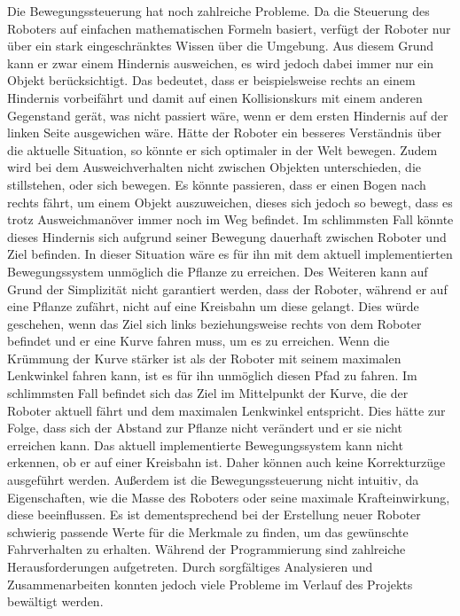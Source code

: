 Die Bewegungssteuerung hat noch zahlreiche Probleme. Da die Steuerung des Roboters auf einfachen mathematischen Formeln basiert, verfügt der Roboter nur über ein stark eingeschränktes Wissen über die Umgebung. Aus diesem Grund kann er zwar einem Hindernis ausweichen, es wird jedoch dabei immer nur ein Objekt berücksichtigt. Das bedeutet, dass er beispielsweise rechts an einem Hindernis vorbeifährt und damit auf einen Kollisionskurs mit einem anderen Gegenstand gerät, was nicht passiert wäre, wenn er dem ersten Hindernis auf der linken Seite ausgewichen wäre. Hätte der Roboter ein besseres Verständnis über die aktuelle Situation, so könnte er sich optimaler in der Welt bewegen. Zudem wird bei dem Ausweichverhalten nicht zwischen Objekten unterschieden, die stillstehen, oder sich bewegen. Es könnte passieren, dass er einen Bogen nach rechts fährt, um einem Objekt auszuweichen, dieses sich jedoch so bewegt, dass es trotz Ausweichmanöver immer noch im Weg befindet. Im schlimmsten Fall könnte dieses Hindernis sich aufgrund seiner Bewegung dauerhaft zwischen Roboter und Ziel befinden. In dieser Situation wäre es für ihn mit dem aktuell implementierten Bewegungssystem unmöglich die Pflanze zu erreichen. 
Des Weiteren kann auf Grund der Simplizität nicht garantiert werden, dass der Roboter, während er auf eine Pflanze zufährt, nicht auf eine Kreisbahn um diese gelangt. Dies würde geschehen, wenn das Ziel sich links beziehungsweise rechts von dem Roboter befindet und er eine Kurve fahren muss, um es zu erreichen. Wenn die Krümmung der Kurve stärker ist als der Roboter mit seinem maximalen Lenkwinkel fahren kann, ist es für ihn unmöglich diesen Pfad zu fahren. Im schlimmsten Fall befindet sich das Ziel im Mittelpunkt der Kurve, die der Roboter aktuell fährt und dem maximalen Lenkwinkel entspricht. Dies hätte zur Folge, dass sich der Abstand zur Pflanze nicht verändert und er sie nicht erreichen kann. Das aktuell implementierte Bewegungssystem kann nicht erkennen, ob er auf einer Kreisbahn ist. Daher können auch keine Korrekturzüge ausgeführt werden.
Außerdem ist die Bewegungssteuerung nicht intuitiv, da Eigenschaften, wie die Masse des Roboters oder seine maximale Krafteinwirkung, diese beeinflussen. Es ist dementsprechend bei der Erstellung neuer Roboter schwierig passende Werte für die Merkmale zu finden, um das gewünschte Fahrverhalten zu erhalten. 
Während der Programmierung sind zahlreiche Herausforderungen aufgetreten. Durch sorgfältiges Analysieren und Zusammenarbeiten konnten jedoch viele Probleme im Verlauf des Projekts bewältigt werden. 
